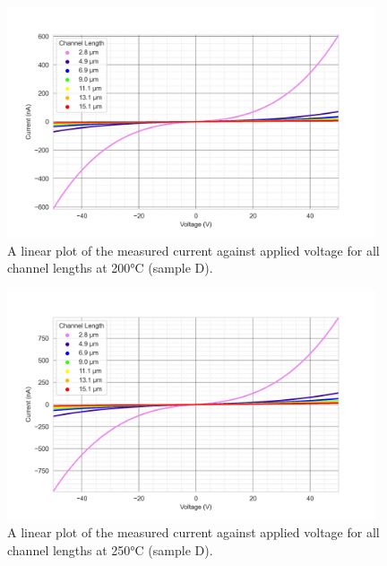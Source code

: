 \begin{figure}[h]
    \centering
    \includegraphics[width=0.97\textwidth]{Chapter3/Figs/Raster/Sample D 2019/IV/50v IV characteristics at 200 C.png}
    \caption{A linear plot of the measured current against applied voltage for all channel lengths at 200\si{\degreeCelsius} (sample D).}
    \label{appfig:D_current_voltage_200_50v}
\end{figure}
\begin{figure}[h]
    \centering
    \includegraphics[width=0.97\textwidth]{Chapter3/Figs/Raster/Sample D 2019/IV/50v IV characteristics at 250 C.png}
    \caption{A linear plot of the measured current against applied voltage for all channel lengths at 250\si{\degreeCelsius} (sample D).}
    \label{appfig:D_current_voltage_250_50v}
\end{figure}
